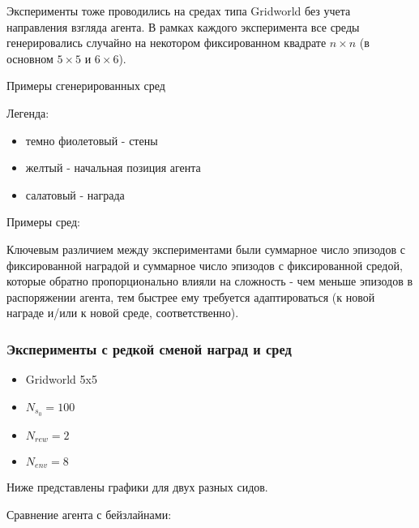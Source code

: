 \documentclass[a4paper]{article}
\begin{document}
Эксперименты тоже проводились на средах типа Gridworld без учета направления взгляда агента. В рамках каждого эксперимента все среды генерировались случайно на некотором фиксированном квадрате $n \times n$ (в основном $5 \times 5$ и $6 \times 6$).

Примеры сгенерированных сред

Легенда:

\begin{itemize}
  \item темно фиолетовый - стены
  \item желтый - начальная позиция агента
  \item салатовый - награда
\end{itemize}

Примеры сред:



Ключевым различием между экспериментами были суммарное число эпизодов с фиксированной наградой и суммарное число эпизодов с фиксированной средой, которые обратно пропорционально влияли на сложность - чем меньше эпизодов в распоряжении агента, тем быстрее ему требуется адаптироваться (к новой награде и/или к новой среде, соответственно).

\subsubsection{Эксперименты с редкой сменой наград и сред}

\begin{itemize}
  \item Gridworld 5x5
  \item $N_{s_0} = 100$
  \item $N_{rew} = 2$
  \item $N_{env} = 8$
\end{itemize}

Ниже представлены графики для двух разных сидов.

Сравнение агента с бейзлайнами:

\end{document}

